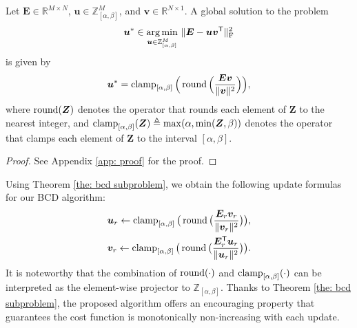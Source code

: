 \begin{theorem} \label{the: bcd subproblem}
	Let $\bm{E} \in \mathbb{R}^{M \times N}$, $\bm{u} \in \mathbb{Z}_{[\alpha,\beta]}^{M}$, and $\bm{v} \in \mathbb{R}^{N \times 1}$. A global solution to the problem
	\begin{equation} \label{eq: bcd subproblem}
		\bm{u}^* \in \underset{\bm{u} \in \mathbb{Z}_{[\alpha,\beta]}^M}{\operatorname*{arg\,min}} \ \lVert \bm{E} - \bm{u} \bm{v}^\mathsf{T} \rVert_\text{F}^2
	\end{equation}
	is given by
	\begin{equation} \label{eq: bcd subproblem solution}
		\bm{u}^* = \operatorname{clamp}_{[\alpha,\beta]}\Big(\operatorname{round}\Big(\frac{\bm{E} \bm{v}}{\lVert \bm{v} \rVert^2}\Big)\Big),
	\end{equation} 
	where $\operatorname{round}(\bm{Z})$ denotes the operator that rounds each element of $\bm{Z}$ to the nearest integer, and $\operatorname{clamp}_{[\alpha,\beta]}(\bm{Z}) \triangleq \max(\alpha, \min(\bm{Z}, \beta))$ denotes the operator that clamps each element of $\bm{Z}$ to the interval $[\alpha,\beta]$.
\end{theorem}
\begin{proof}
	See Appendix \ref{app: proof} for the proof.
\end{proof}

Using Theorem \ref{the: bcd subproblem}, we obtain the following update formulas for our BCD algorithm:
\begin{align} 
	\bm{u}_r \gets \operatorname{clamp}_{[\alpha,\beta]}\big(\operatorname{round}\big(\frac{\bm{E}_r \bm{v}_r}{\lVert \bm{v}_r \rVert^2}\big)\big), \label{eq: bcd subproblem solution: u} \\
	\bm{v}_r \gets \operatorname{clamp}_{[\alpha,\beta]}\big(\operatorname{round}\big(\frac{\bm{E}_r^\mathsf{T} \bm{u}_r}{\lVert \bm{u}_r \rVert^2}\big)\big). \label{eq: bcd subproblem solution: v}
\end{align}
It is noteworthy that the combination of $\operatorname{round}(\cdot)$ and $\operatorname{clamp}_{[\alpha,\beta]}(\cdot)$ can be interpreted as the element-wise projector to $\mathbb{Z}_{[\alpha,\beta]}$. Thanks to Theorem \ref{the: bcd subproblem}, the proposed algorithm offers an encouraging property that guarantees the cost function is monotonically non-increasing with each update. 


